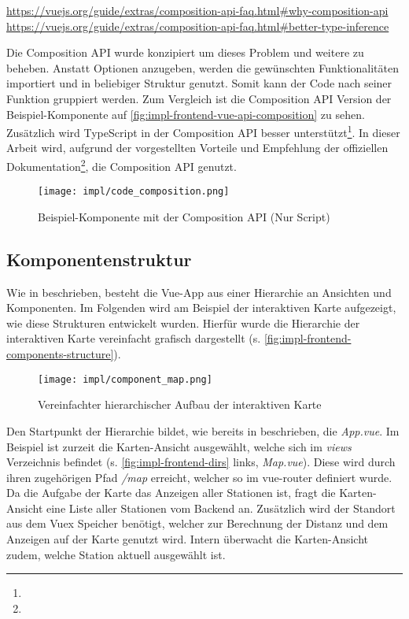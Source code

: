 \urldef\vuecomp\url{https://vuejs.org/guide/extras/composition-api-faq.html#why-composition-api}
\urldef\vuets\url{https://vuejs.org/guide/extras/composition-api-faq.html#better-type-inference}

Die Composition API wurde konzipiert um dieses Problem und weitere zu beheben.
Anstatt Optionen anzugeben, werden die gewünschten Funktionalitäten importiert
und in beliebiger Struktur genutzt. Somit kann der Code nach seiner Funktion
gruppiert werden. Zum Vergleich ist die Composition API Version der
Beispiel-Komponente auf \autoref{fig:impl-frontend-vue-api-composition} zu
sehen. Zusätzlich wird TypeScript in der Composition API besser
unterstützt\footnote{\vuets}. In dieser Arbeit wird, aufgrund der vorgestellten
Vorteile und Empfehlung der offiziellen Dokumentation\footnote{\vuecomp}, die
Composition API genutzt.

\begin{figure}[htpb]
    \centering
    \texttt{[image: impl/code\_composition.png]}
    \caption{Beispiel-Komponente mit der Composition API (Nur Script)}
    \label{fig:impl-frontend-vue-api-composition}
\end{figure}


\subsection{Komponentenstruktur}

Wie in  beschrieben, besteht die Vue-App
aus einer Hierarchie an Ansichten und Komponenten. Im Folgenden wird am Beispiel
der interaktiven Karte aufgezeigt, wie diese Strukturen entwickelt wurden.
Hierfür wurde die Hierarchie der interaktiven Karte vereinfacht grafisch
dargestellt (s. \autoref{fig:impl-frontend-components-structure}).

\begin{figure}[htpb]
    \centering
    \texttt{[image: impl/component\_map.png]}
    \caption{Vereinfachter hierarchischer Aufbau der interaktiven Karte}
    \label{fig:impl-frontend-components-structure}
\end{figure}

Den Startpunkt der Hierarchie bildet, wie bereits in
 beschrieben, die \textit{App.vue}. Im
Beispiel ist zurzeit die Karten-Ansicht ausgewählt, welche sich im
\textit{views} Verzeichnis befindet (s. \autoref{fig:impl-frontend-dirs} links,
\textit{Map.vue}). Diese wird durch ihren zugehörigen Pfad \textit{/map}
erreicht, welcher so im vue-router definiert wurde. Da die Aufgabe der Karte das
Anzeigen aller Stationen ist, fragt die Karten-Ansicht eine Liste aller
Stationen vom Backend an. Zusätzlich wird der Standort aus dem Vuex Speicher
benötigt, welcher zur Berechnung der Distanz und dem Anzeigen auf der Karte
genutzt wird. Intern überwacht die Karten-Ansicht zudem, welche Station aktuell
ausgewählt ist.

